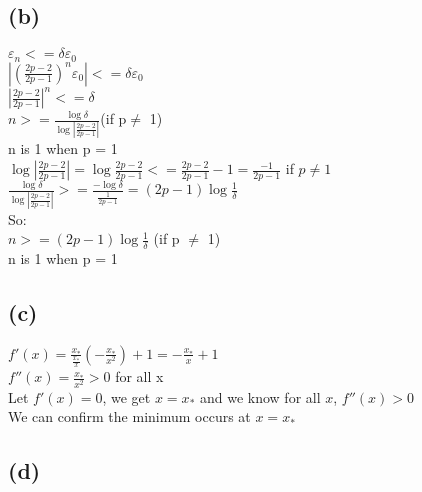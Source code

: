 \documentclass [11pt, a4paper, oneside] {article}
\begin{document}
\subsection *{(b)}
$\varepsilon_n <= \delta \varepsilon_0$\\
$|(\frac{2p-2}{2p-1})^n\varepsilon_0| <= \delta \varepsilon_0$\\
$|\frac{2p-2}{2p-1}|^n <= \delta $\\
$n >= \frac{\log\delta}{\log{|\frac{2p-2}{2p-1}|}}$(if p$\neq$ 1)\\
n is 1 when p = 1\\
$\log{|\frac{2p-2}{2p-1}|} = \log{\frac{2p-2}{2p-1}} <= \frac{2p-2}{2p-1} - 1 = \frac{-1}{2p-1}$ if $p\neq 1$\\
$\frac{\log\delta}{\log{|\frac{2p-2}{2p-1}|}} >= \frac{-\log\delta}{\frac{1}{2p-1}} = (2p-1)\log\frac{1}{\delta}$\\
So:\\
$n >= (2p-1)\log\frac{1}{\delta}$ (if p $\neq$ 1)\\
n is 1 when p = 1\\ 
\subsection *{(c)}
$f'(x) = \frac{x_*}{\frac{x_*}{x}}(-\frac{x_*}{x^2})+1 = -\frac{x_*}{x}+1$\\
$f''(x) = \frac{x_*}{x^2} > 0$ for all x\\
Let $f'(x) = 0$, we get  $x=x_*$ and we know for all $x$, $f''(x) > 0$\\
We can confirm the minimum occurs at $x=x_*$\\
\subsection *{(d)}
\end{document}
